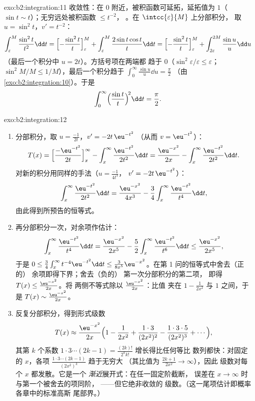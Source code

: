 \begin{solution}{exo:b2:integration:11}
收敛性：在 $0$ 附近，被积函数可延拓，延拓值为
$1$（$\sin t \sim t$）；无穷远处被积函数 $\leq t^{-2}$，
。在 $\intcc{\varepsilon}{M}$ 上分部积分，
取 $u = \sin^2 t$，$v' = t^{-2}$：
\[
\int_\varepsilon^M \frac{\sin^2 t}{t^2}\dd t
= \Bigl[-\frac{\sin^2 t}{t}\Bigr]_\varepsilon^M
+ \int_\varepsilon^M \frac{2\sin t\cos t}{t}\dd t
= \Bigl[-\frac{\sin^2 t}{t}\Bigr]_\varepsilon^M
+ \int_{2\varepsilon}^{2M} \frac{\sin u}{u}\dd u
\]
（最后一个积分中 $u = 2t$）。方括号项在两端都
趋于 $0$（$\sin^2\varepsilon/\varepsilon \leq \varepsilon$；
$\sin^2 M/M \leq 1/M$），最后一个积分趋于
$\int_0^\infty \frac{\sin u}{u}\dd u = \frac\pi2$
（由\cref{exo:b2:integration:10}）。于是
\[
\int_0^\infty \Bigl(\frac{\sin t}{t}\Bigr)^{\!2}\dd t
= \frac\pi2 .
\]
\end{solution}

\begin{solution}{exo:b2:integration:12}
\begin{enumerate}
  \item 分部积分，取 $u = \frac{-1}{2t}$，$v' = -2t\,\eu^{-t^2}$
        （从而 $v = \eu^{-t^2}$）：
        \[
        T(x) = \Bigl[\frac{-\eu^{-t^2}}{2t}\Bigr]_x^\infty
        - \int_x^\infty \frac{\eu^{-t^2}}{2t^2}\dd t
        = \frac{\eu^{-x^2}}{2x}
        - \int_x^\infty \frac{\eu^{-t^2}}{2t^2}\dd t .
        \]
        对新的积分用同样的手法（$u = \frac{-1}{4t^3}$，
        $v' = -2t\,\eu^{-t^2}$）：
        \[
        \int_x^\infty \frac{\eu^{-t^2}}{2t^2}\dd t
        = \frac{\eu^{-x^2}}{4x^3}
        - \frac34\int_x^\infty \frac{\eu^{-t^2}}{t^4}\dd t ,
        \]
        由此得到所预告的恒等式。
  \item 再分部积分一次，对余项作估计：
        \[
        \int_x^\infty \frac{\eu^{-t^2}}{t^4}\dd t
        = \frac{\eu^{-x^2}}{2x^5}
        - \frac52\int_x^\infty\frac{\eu^{-t^2}}{t^6}\dd t
        \leq \frac{\eu^{-x^2}}{2x^5},
        \]
        于是 $0 \leq \frac34\int_x^\infty t^{-4}\eu^{-t^2}\dd t
        \leq \frac{3}{8x^5}\eu^{-x^2}$。在第 1 问的恒等式中舍去（正的）
        余项即得下界；舍去（负的）
        第一次分部积分的第二项，
        即得 $T(x) \leq \frac{\eu^{-x^2}}{2x}$。将
        两侧不等式除以 $\frac{\eu^{-x^2}}{2x}$：比值
        夹在 $1 - \frac{1}{2x^2}$ 与 $1$ 之间，于是 $T(x)
        \sim \frac{\eu^{-x^2}}{2x}$。
  \item 反复分部积分，得到形式级数
        \[
        T(x) \approx \frac{\eu^{-x^2}}{2x}\Bigl(1 -
        \frac{1}{2x^2} + \frac{1\cdot3}{(2x^2)^2} -
        \frac{1\cdot3\cdot5}{(2x^2)^3} + \cdots\Bigr),
        \]
        其第 $k$ 个系数 $1\cdot3\cdots(2k-1) =
        \frac{(2k)!}{2^k k!}$ 增长得比任何等比
        数列都快：对固定的 $x$，各项
        $\frac{1\cdot3\cdots(2k-1)}{(2x^2)^k}$ 趋于无穷大
        （其比值为 $\frac{2k+1}{2x^2} \to \infty$），因此
        级数对每个 $x$ 都发散。它是一个
        \emph{渐近}展开式：在任一固定阶截断，
        误差在 $x \to \infty$ 时与第一个被舍去的项同阶，
        ——但它绝非收敛的
        级数。（这一尾项估计即概率各章中的标准高斯
        尾部界。）
\end{enumerate}
\end{solution}

